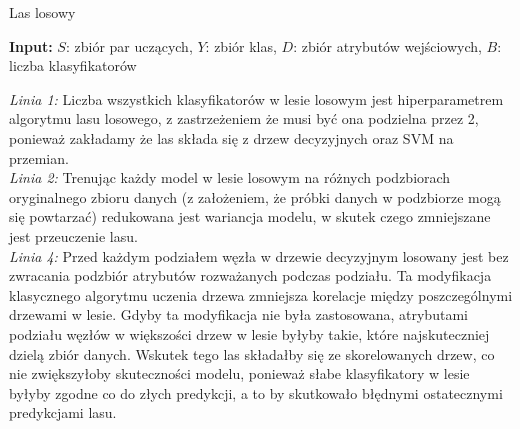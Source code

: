 \documentclass[
    left=2.5cm,         %
    right=2.5cm,        %
    top=2.5cm,          %
    bottom=3cm,         %
    bindingoffset=6mm,  %
    nohyphenation=false %
]{eiti/eiti-report}
\begin{document}
\begin{algorithm}
\caption{Las losowy}\label{alg:cap}
\hspace*{\algorithmicindent} \textbf{Input:} \begin{math}\mathit{S}\end{math}: zbiór par uczących, \begin{math}\mathit{Y}\end{math}: zbiór klas, $D$: zbiór atrybutów wejściowych, $B$: liczba klasyfikatorów
\begin{algorithmic}[1]
    \Else
    \EndIf
\end{algorithmic}
\end{algorithm}

\textit{Linia 1:}
Liczba wszystkich klasyfikatorów w lesie losowym jest hiperparametrem algorytmu lasu losowego, z zastrzeżeniem że musi być ona podzielna przez 2, ponieważ zakładamy że las składa się z drzew decyzyjnych oraz SVM na przemian.\\

\textit{Linia 2:}
Trenując każdy model w lesie losowym na różnych podzbiorach oryginalnego zbioru danych (z założeniem, że próbki danych w podzbiorze mogą się powtarzać) redukowana jest wariancja modelu, w skutek czego zmniejszane jest przeuczenie lasu.\\

\textit{Linia 4:}
Przed każdym podziałem węzła w drzewie decyzyjnym losowany jest bez zwracania podzbiór atrybutów rozważanych podczas podziału. Ta modyfikacja klasycznego algorytmu uczenia drzewa zmniejsza korelacje między poszczególnymi drzewami w lesie. Gdyby ta modyfikacja nie była zastosowana, atrybutami podziału węzłów w większości drzew w lesie byłyby takie, które najskuteczniej dzielą zbiór danych. Wskutek tego las składałby się ze skorelowanych drzew, co nie zwiększyłoby skuteczności modelu, ponieważ słabe klasyfikatory w lesie byłyby zgodne co do złych predykcji, a to by skutkowało błędnymi ostatecznymi predykcjami lasu.
\end{document}

